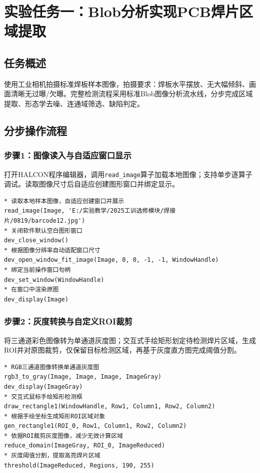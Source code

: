 \documentclass[UTF8,a4paper,12pt]{ctexart}
\begin{document}
\section{实验任务一：Blob分析实现PCB焊片区域提取}
\subsection{任务概述}
使用工业相机拍摄标准焊板样本图像，拍摄要求：焊板水平摆放、无大幅倾斜、画面清晰无过曝/欠曝。完整检测流程采用标准Blob图像分析流水线，分步完成区域提取、形态学去噪、连通域筛选、缺陷判定。

\subsection{分步操作流程}
\subsubsection{步骤1：图像读入与自适应窗口显示}
打开HALCON程序编辑器，调用\texttt{read\_image}算子加载本地图像；支持单步逐算子调试。读取图像尺寸后自适应创建图形窗口并绑定显示。
\begin{lstlisting}[style=halconstyle, caption={图像读入与自适应窗口显示}]
* 读取本地样本图像，自适应创建窗口并展示
read_image(Image, 'E:/实验教学/2025工训选修模块/焊接片/0819/barcode12.jpg')
* 关闭软件默认空白图形窗口
dev_close_window()
* 根据图像分辨率自动适配窗口尺寸
dev_open_window_fit_image(Image, 0, 0, -1, -1, WindowHandle)
* 绑定当前操作窗口句柄
dev_set_window(WindowHandle)
* 在窗口中渲染原图
dev_display(Image)
\end{lstlisting}

\subsubsection{步骤2：灰度转换与自定义ROI裁剪}
将三通道彩色图像转为单通道灰度图；交互式手绘矩形划定待检测焊片区域，生成ROI并对原图裁剪，仅保留目标检测区域，再基于灰度直方图完成阈值分割。
\begin{lstlisting}[style=halconstyle, caption={彩色图灰度化 + ROI感兴趣区域提取}]
* RGB三通道图像转换单通道灰度图
rgb3_to_gray(Image, Image, Image, ImageGray)
dev_display(ImageGray)
* 交互式鼠标手绘矩形检测框
draw_rectangle1(WindowHandle, Row1, Column1, Row2, Column2)
* 根据手绘坐标生成矩形ROI区域对象
gen_rectangle1(ROI_0, Row1, Column1, Row2, Column2)
* 依据ROI裁剪灰度图像，减少无效计算区域
reduce_domain(ImageGray, ROI_0, ImageReduced)
* 灰度阈值分割，提取高亮焊片区域
threshold(ImageReduced, Regions, 190, 255)
\end{lstlisting}
\end{document}
